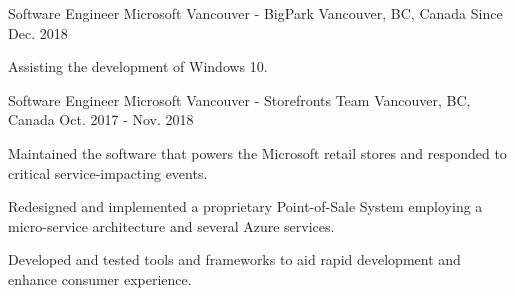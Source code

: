 

\begin{cventries}

  \cventry
    {Software Engineer} %
    {Microsoft Vancouver - BigPark} %
    {Vancouver, BC, Canada} %
    {Since Dec. 2018} %
    {
      \begin{cvitems} %
	\item {Assisting the development of Windows 10.}
        \\
      \end{cvitems}
    }

  \cventry
    {Software Engineer} %
    {Microsoft Vancouver - Storefronts Team} %
    {Vancouver, BC, Canada} %
    {Oct. 2017 - Nov. 2018} %
    {
      \begin{cvitems} %
	\item {Maintained the software that powers the Microsoft retail stores and responded to critical service-impacting events.}
	\item {Redesigned and implemented a proprietary Point-of-Sale System employing a micro-service architecture and several Azure services.}
        \item {Developed and tested tools and frameworks to aid rapid development and enhance consumer experience.}
        \\
      \end{cvitems}
    }


\end{cventries}
